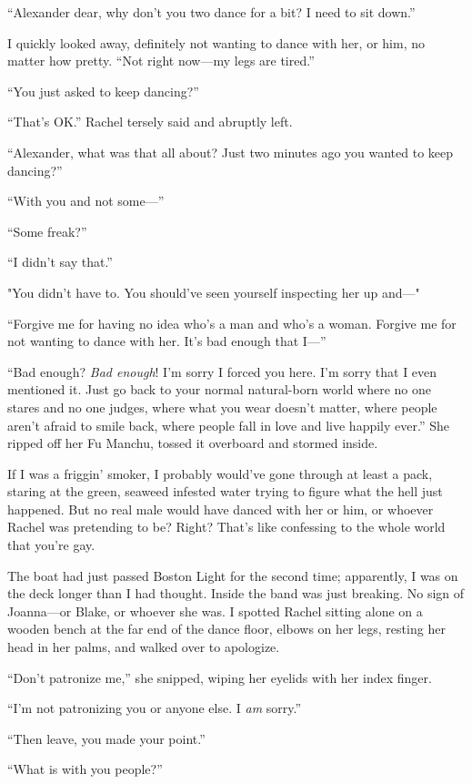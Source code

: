 ``Alexander dear, why don't you two dance for a bit? I need to sit
down.''

I quickly looked away, definitely not wanting to dance with her, or him,
no matter how pretty. ``Not right now---my legs are tired.''

``You just asked to keep dancing?''

``That's OK.'' Rachel tersely said and abruptly left.

``Alexander, what was that all about? Just two minutes ago you wanted to
keep dancing?''

``With you and not some---''

``Some freak?''

``I didn't say that.''

"You didn't have to. You should've seen yourself inspecting her up
and---"

``Forgive me for having no idea who's a man and who's a woman. Forgive
me for not wanting to dance with her. It's bad enough that I---''

``Bad enough? \emph{Bad enough}! I'm sorry I forced you here. I'm sorry
that I even mentioned it. Just go back to your normal natural-born world
where no one stares and no one judges, where what you wear doesn't
matter, where people aren't afraid to smile back, where people fall in
love and live happily ever.'' She ripped off her Fu Manchu, tossed it
overboard and stormed inside.

If I was a friggin' smoker, I probably would've gone through at least a
pack, staring at the green, seaweed infested water trying to figure what
the hell just happened. But no real male would have danced with her or
him, or whoever Rachel was pretending to be? Right? That's like
confessing to the whole world that you're gay.

The boat had just passed Boston Light for the second time; apparently, I
was on the deck longer than I had thought. Inside the band was just
breaking. No sign of Joanna---or Blake, or whoever she was. I spotted
Rachel sitting alone on a wooden bench at the far end of the dance
floor, elbows on her legs, resting her head in her palms, and walked
over to apologize.

``Don't patronize me,'' she snipped, wiping her eyelids with her index
finger.

``I'm not patronizing you or anyone else. I \emph{am} sorry.''

``Then leave, you made your point.''

``What is with you people?''

